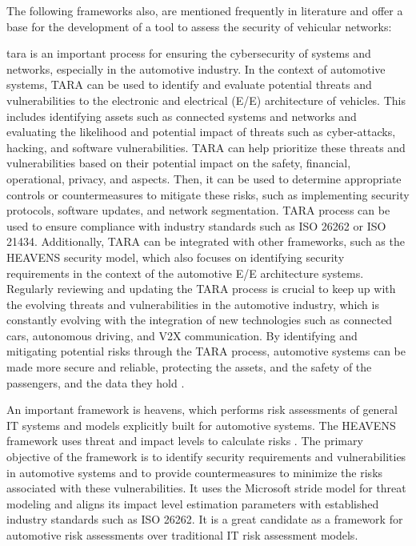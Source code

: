 The following frameworks also, are mentioned frequently in literature and offer a base for the development of a tool to assess the security of vehicular networks:

\gls{tara} is an important process for ensuring the cybersecurity of systems and networks, especially in the automotive industry. 
In the context of automotive systems, TARA can be used to identify and evaluate potential threats and vulnerabilities to the electronic and electrical (E/E) architecture of vehicles. 
This includes identifying assets such as connected systems and networks and evaluating the likelihood and potential impact of threats such as cyber-attacks, hacking, and software vulnerabilities.
TARA can help prioritize these threats and vulnerabilities based on their potential impact on the safety, financial, operational, privacy, and aspects. 
Then, it can be used to determine appropriate controls or countermeasures to mitigate these risks, such as implementing security protocols, software updates, and network segmentation.
TARA process can be used to ensure compliance with industry standards such as ISO 26262 or ISO 21434. 
Additionally, TARA can be integrated with other frameworks, such as the HEAVENS security model, which also focuses on identifying security requirements in the context of the automotive E/E architecture systems.
Regularly reviewing and updating the TARA process is crucial to keep up with the evolving threats and vulnerabilities in the automotive industry, 
which is constantly evolving with the integration of new technologies such as connected cars, autonomous driving, and V2X communication. 
By identifying and mitigating potential risks through the TARA process, automotive systems can be made more secure and reliable, protecting the assets, and the safety of the passengers, and the data they hold \cite{tara}.

An important framework is \gls{heavens}, which performs risk assessments of general IT systems and models explicitly built for automotive systems. 
The HEAVENS framework uses threat and impact levels to calculate risks \cite{heavens}.
The primary objective of the framework is to identify security requirements and vulnerabilities in automotive systems and to provide countermeasures to minimize the risks associated with these vulnerabilities. 
It uses the Microsoft \acrshort{stride} model for threat modeling and aligns its impact level estimation parameters with established industry standards such as ISO 26262. 
It is a great candidate as a framework for automotive risk assessments over traditional IT risk assessment models.

